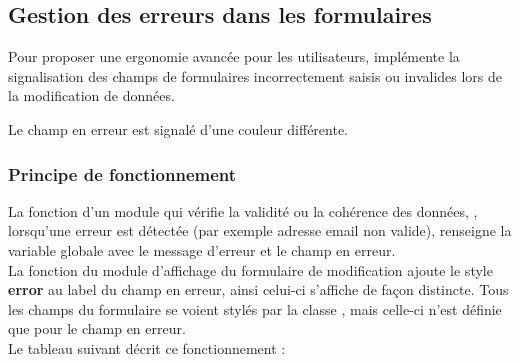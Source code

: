 

\subsection{Gestion des erreurs dans les formulaires}

Pour proposer une ergonomie avancée pour les utilisateurs, \obm implémente la signalisation des champs de formulaires incorrectement saisis ou invalides lors de la modification de données.

Le champ en erreur est signalé d'une couleur différente.

\subsubsection{Principe de fonctionnement}

La fonction d'un module qui vérifie la validité ou la cohérence des données, , lorsqu'une erreur est détectée (par exemple adresse email non valide), renseigne la variable globale  avec le message d'erreur et le champ en erreur.\\

La fonction du module d'affichage du formulaire de modification ajoute le style \textbf{error} au label du champ en erreur, ainsi celui-ci s'affiche de façon distincte.
Tous les champs du formulaire se voient stylés par la classe , mais celle-ci n'est définie que pour le champ en erreur.\\
Le tableau suivant décrit ce fonctionnement :\\

